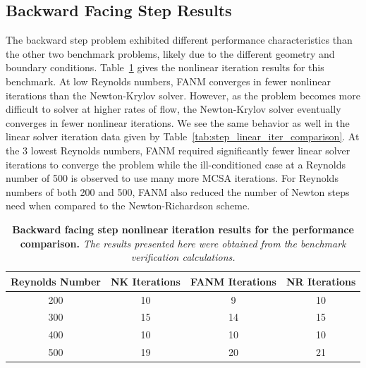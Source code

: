 \clearpage

\subsection{Backward Facing Step Results}
\label{subsec:backward_step_comparison}

The backward step problem exhibited different performance
characteristics than the other two benchmark problems, likely due to
the different geometry and boundary
conditions. Table~\ref{tab:step_nonlinear_iter_comparison} gives the
nonlinear iteration results for this benchmark. At low Reynolds
numbers, FANM converges in fewer nonlinear iterations than the
Newton-Krylov solver. However, as the problem becomes more difficult
to solver at higher rates of flow, the Newton-Krylov solver eventually
converges in fewer nonlinear iterations. We see the same behavior as
well in the linear solver iteration data given by
Table~\ref{tab:step_linear_iter_comparison}. At the 3 lowest Reynolds
numbers, FANM required significantly fewer linear solver iterations to
converge the problem while the ill-conditioned case at a Reynolds
number of 500 is observed to use many more MCSA iterations. For
Reynolds numbers of both 200 and 500, FANM also reduced the number of
Newton steps need when compared to the Newton-Richardson scheme.

\begin{table}[h!]
  \begin{center}
    \begin{tabular}{cccc}\hline\hline
      \multicolumn{1}{c}{Reynolds Number}& 
      \multicolumn{1}{c}{NK Iterations}&
      \multicolumn{1}{c}{FANM Iterations}&
      \multicolumn{1}{c}{NR Iterations}\\
      \hline
      200 & 10 & 9 & 10\\
      300 & 15 & 14 & 15\\
      400 & 10 & 10 & 10\\
      500 & 19 & 20 & 21\\
      \hline\hline
    \end{tabular}
  \end{center}
  \caption{\textbf{Backward facing step nonlinear iteration
      results for the performance comparison.} \textit{The results
      presented here were obtained from the benchmark verification
      calculations.}}
  \label{tab:step_nonlinear_iter_comparison}
\end{table}

